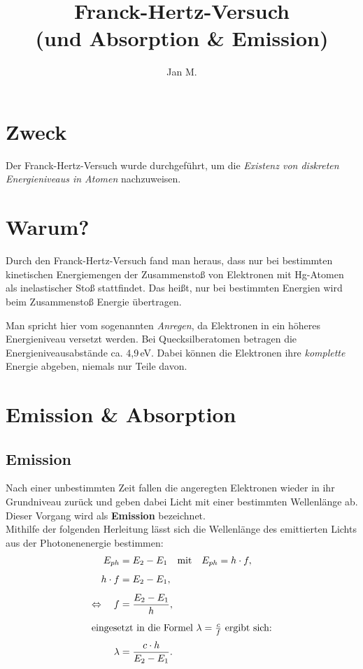 \documentclass[a4paper,11pt]{article}
\title{Franck-Hertz-Versuch\\ \large (und Absorption \& Emission)}
\author{Jan M.}
\date{}
\begin{document}
\maketitle
\section{Zweck}
Der Franck-Hertz-Versuch wurde durchgeführt, um die \textit{Existenz von diskreten Energieniveaus in Atomen} nachzuweisen.

\section{Warum?}
Durch den Franck-Hertz-Versuch fand man heraus, dass nur bei bestimmten kinetischen Energiemengen der Zusammenstoß von Elektronen mit Hg-Atomen als inelastischer Stoß stattfindet. Das heißt, nur bei bestimmten Energien wird beim Zusammenstoß Energie übertragen.

\vspace{0.5em}
Man spricht hier vom sogenannten \textit{Anregen}, da Elektronen in ein höheres Energieniveau versetzt werden. Bei Quecksilberatomen betragen die Energieniveausabstände ca. 4,9\,eV. Dabei können die Elektronen ihre \textit{komplette} Energie abgeben, niemals nur Teile davon.

\section{Emission \& Absorption}

\subsection{Emission}
Nach einer unbestimmten Zeit fallen die angeregten Elektronen wieder in ihr Grundniveau zurück und geben dabei Licht mit einer bestimmten Wellenlänge ab. Dieser Vorgang wird als \textbf{Emission} bezeichnet.\\[1ex]
Mithilfe der folgenden Herleitung lässt sich die Wellenlänge des emittierten Lichts aus der Photonenenergie bestimmen:
\begin{align*}
E_{ph} &= E_{2} - E_{1} \quad \text{mit} \quad E_{ph} = h \cdot f,\\[1ex]
h \cdot f &= E_{2} - E_{1},\\[1ex]
\Leftrightarrow\quad f &= \frac{E_{2} - E_{1}}{h},\\[1ex]
\intertext{eingesetzt in die Formel $\lambda = \frac{c}{f}$ ergibt sich:}
\lambda &= \frac{c \cdot h}{E_{2} - E_{1}}.
\end{align*}
\end{document}
